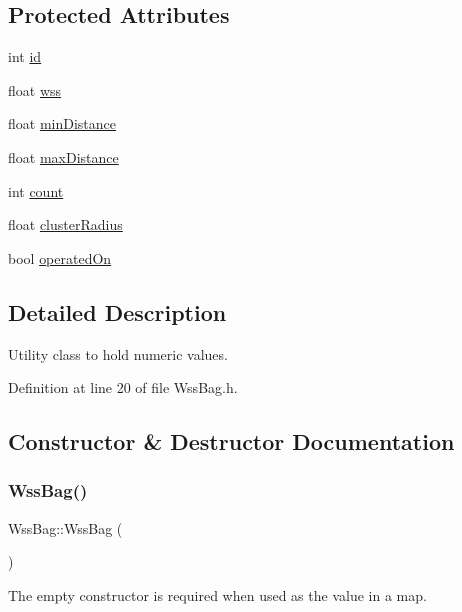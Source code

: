 \subsection*{Protected Attributes}
\begin{DoxyCompactItemize}
\item 
int \hyperlink{class_wss_bag_ab428fb4d86dba46033e23d799ce48cbd}{id}
\item 
float \hyperlink{class_wss_bag_a95962ba44b5f1fde09bfc53e5c83afaf}{wss}
\item 
float \hyperlink{class_wss_bag_ab4b90933446259adba9c59cbadd8dfac}{min\+Distance}
\item 
float \hyperlink{class_wss_bag_a22f03f5b980f81a16ef4dda0fbec1cb2}{max\+Distance}
\item 
int \hyperlink{class_wss_bag_a08a9a4fff1f870829390b302ce664569}{count}
\item 
float \hyperlink{class_wss_bag_a30ae57df2d130fd6e2ce756148d5cd51}{cluster\+Radius}
\item 
bool \hyperlink{class_wss_bag_a6092b58db8c3ab366ddc74b3d5ff1ae4}{operated\+On}
\end{DoxyCompactItemize}


\subsection{Detailed Description}
Utility class to hold numeric values. 

Definition at line 20 of file Wss\+Bag.\+h.



\subsection{Constructor \& Destructor Documentation}
\mbox{\label{class_wss_bag_a67435486174798f81a34887ef2e043b8}} 
\subsubsection{\texorpdfstring{Wss\+Bag()}{WssBag()}}
{\footnotesize\ttfamily Wss\+Bag\+::\+Wss\+Bag (\begin{DoxyParamCaption}{ }\end{DoxyParamCaption})}

The empty constructor is required when used as the value in a map. 

